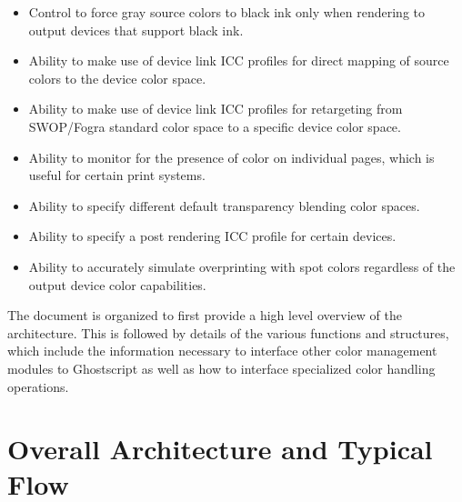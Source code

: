\documentclass[12pt,notitlepage]{article}
\begin{document}
\begin{itemize}
\item Control to force gray source colors to black ink only when rendering to output devices that support black ink.
\item Ability to make use of device link ICC profiles for direct mapping of source colors to the device color space.
\item Ability to make use of device link ICC profiles for retargeting from SWOP/Fogra standard color space to a specific device color space.
\item Ability to monitor for the presence of color on individual pages, which is useful for certain print systems.
\item Ability to specify different default transparency blending color spaces.
\item Ability to specify a post rendering ICC profile for certain devices.
\item Ability to accurately simulate overprinting with spot colors regardless of the output device color capabilities.
\end{itemize}
The document is organized to first provide a high level overview of the architecture. This is followed by details of the various functions and structures, which include the information necessary to interface other color management modules to Ghostscript as well as how to interface specialized color handling operations.

\section{Overall Architecture and Typical Flow}
\end{document}
